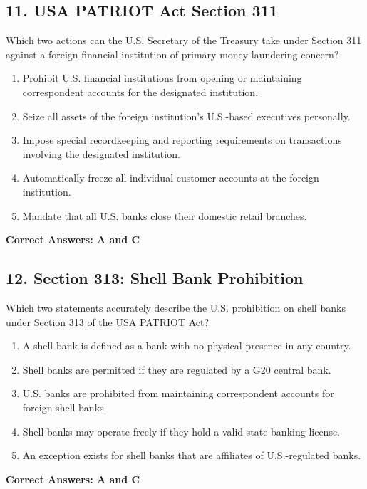 \documentclass[11pt,a4paper]{article}
\begin{document}
	\subsection{11. USA PATRIOT Act Section 311}
	Which two actions can the U.S. Secretary of the Treasury take under Section 311 against a foreign financial institution of primary money laundering concern?
	\begin{enumerate}[label=\Alph*.]
		\item Prohibit U.S. financial institutions from opening or maintaining correspondent accounts for the designated institution.
		\item Seize all assets of the foreign institution's U.S.-based executives personally.
		\item Impose special recordkeeping and reporting requirements on transactions involving the designated institution.
		\item Automatically freeze all individual customer accounts at the foreign institution.
		\item Mandate that all U.S. banks close their domestic retail branches.
	\end{enumerate}
	\textbf{Correct Answers: A and C}
	
	\subsection{12. Section 313: Shell Bank Prohibition}
	Which two statements accurately describe the U.S. prohibition on shell banks under Section 313 of the USA PATRIOT Act?
	\begin{enumerate}[label=\Alph*.]
		\item A shell bank is defined as a bank with no physical presence in any country.
		\item Shell banks are permitted if they are regulated by a G20 central bank.
		\item U.S. banks are prohibited from maintaining correspondent accounts for foreign shell banks.
		\item Shell banks may operate freely if they hold a valid state banking license.
		\item An exception exists for shell banks that are affiliates of U.S.-regulated banks.
	\end{enumerate}
	\textbf{Correct Answers: A and C}
	
\end{document}
